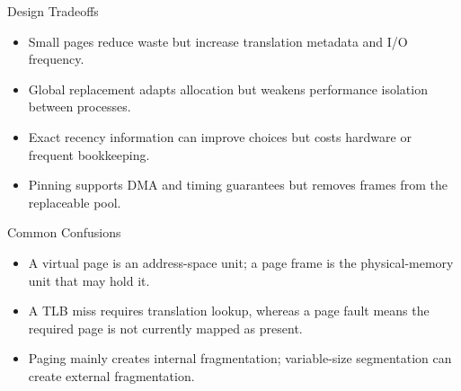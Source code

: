 \documentclass[10pt,letterpaper]{article}
\begin{document}
\begin{studybox}{Design Tradeoffs}
\begin{itemize}
  \item Small pages reduce waste but increase translation metadata and I/O frequency.
  \item Global replacement adapts allocation but weakens performance isolation between processes.
  \item Exact recency information can improve choices but costs hardware or frequent bookkeeping.
  \item Pinning supports DMA and timing guarantees but removes frames from the replaceable pool.
\end{itemize}
\end{studybox}

\begin{studybox}{Common Confusions}
\begin{itemize}
  \item A virtual page is an address-space unit; a page frame is the physical-memory unit that may hold it.
  \item A TLB miss requires translation lookup, whereas a page fault means the required page is not currently mapped as present.
  \item Paging mainly creates internal fragmentation; variable-size segmentation can create external fragmentation.
\end{itemize}
\end{studybox}
\end{document}
